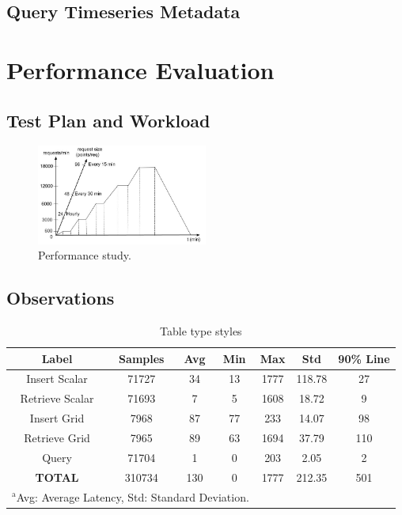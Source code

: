 \documentclass[conference]{IEEEtran}
\newcommand{\db}[1]{\textcolor{blue!40}{#1}}
\begin{document}
\subsection{Query Timeseries Metadata}


\section{Performance \db{Evaluation}}
\subsection{Test Plan and Workload}
\begin{figure}[htbp]
\centerline{\includegraphics[width=0.5\textwidth]{results/work_load/performance_study_v4.jpg}}
\caption{Performance study.}
\label{fi:performance_Study}
\end{figure}

\subsection{Observations}
\begin{table}[htbp]
\caption{Table type styles}
\begin{center}
\begin{tabular}{|c|c|c|c|c|c|c|}
\hline
\textbf{Label} & \textbf{Samples} & \textbf{Avg} & \textbf{Min} & \textbf{Max} & \textbf{Std} & \textbf{90\% Line} \\ \hline
Insert Scalar & 71727 & 34 & 13 & 1777 & 118.78 & 27 \\ \hline
Retrieve Scalar & 71693 & 7 & 5 & 1608 & 18.72 & 9 \\ \hline
Insert Grid & 7968 & 87 & 77 & 233 & 14.07 & 98 \\ \hline
Retrieve Grid & 7965 & 89 & 63 & 1694 & 37.79 & 110 \\ \hline
Query & 71704 & 1 & 0 & 203 & 2.05 & 2 \\ \hline
\textbf{TOTAL} & 310734 & 130 & 0 & 1777 & 212.35 & 501 \\ \hline
\multicolumn{4}{l}{$^{\mathrm{a}}$Avg: Average Latency, Std: Standard Deviation.}
\end{tabular}
\label{tab:obs_all_auto_15_min_summary_latency}
\end{center}
\end{table}
\end{document}
